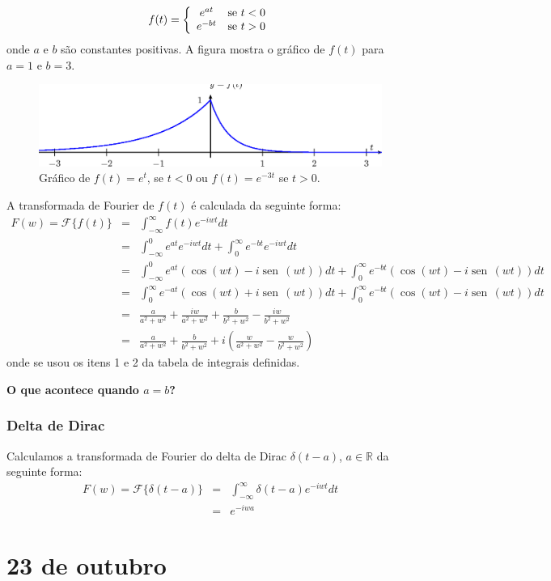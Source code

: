 \documentclass[a4paper,10pt]{book}
\newcommand{\sen}{\operatorname{sen}\,}
\begin{document}
 \begin{equation}f(t)=\left\{\begin{array}{cc}e^{at}&\hbox{se}\ t<0\\
 e^{-bt}&\hbox{se}\ t>0
 \end{array}\right.
 \end{equation}
 onde $a$ e $b$ são constantes positivas. A figura  mostra o gráfico de $f(t)$ para $a=1$ e $b=3$.
 \begin{figure}[!ht]
 \begin{center}
 \includegraphics{figs/cap_transformada_de_fourier_figura_7}\end{center}
 \caption{\label{fig_trans_1} Gráfico de $f(t)=e^{t}$, se $t<0$ ou $f(t)=e^{-3t}$ se $t>0$.  }
 \end{figure}
 A transformada de Fourier de $f(t)$ é calculada da seguinte forma:
 \begin{eqnarray*}
 F(w)=\mathcal{F}\{f(t)\}&=&\int_{-\infty}^\infty f(t) e^{-i w t}dt\\
 &=&\int_{-\infty}^0 e^{at} e^{-i w t}dt+\int_{0}^\infty e^{-bt} e^{-i w t}dt\\
 &=&\int_{-\infty}^0 e^{at} \left(\cos(wt)-i\sen(wt)\right)dt+\int_{0}^\infty e^{-bt} \left(\cos(wt)-i\sen(wt)\right)dt\\
 &=&\int_{0}^\infty e^{-at} \left(\cos(wt)+i\sen(wt)\right)dt+\int_{0}^\infty e^{-bt} \left(\cos(wt)-i\sen(wt)\right)dt\\
 &=&\frac{a}{a^2+w^2}+\frac{iw}{a^2+w^2}+\frac{b}{b^2+w^2}-\frac{iw}{b^2+w^2}\\
 &=&\frac{a}{a^2+w^2}+\frac{b}{b^2+w^2}+i\left(\frac{w}{a^2+w^2}-\frac{w}{b^2+w^2}\right)
 \end{eqnarray*}
 onde se usou os itens 1 e 2 da tabela de integrais definidas.

 {\bf O que acontece quando $a=b$?}
% 
 \subsection{Delta de Dirac}
 
 Calculamos a transformada de Fourier do delta de Dirac $\delta(t-a)$, $a\in\mathbb{R}$ da seguinte forma:
 \begin{eqnarray*}
 F(w)=\mathcal{F}\{\delta(t-a)\}&=&\int_{-\infty}^\infty \delta(t-a) e^{-i w t}dt\\
 &=&e^{-i w a}
 \end{eqnarray*}

 \chapter{23 de outubro}
\end{document}
